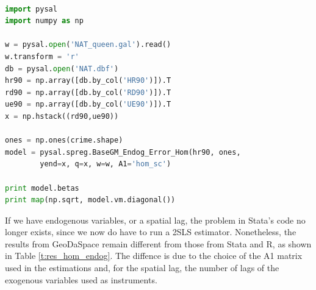 \documentclass{article}
\begin{document}
\begin{code}
\begin{lstlisting}[label=lt:hom_stata,caption=Using PySAL to match the results of spatial error models from Stata,language=Python]

import pysal
import numpy as np

w = pysal.open('NAT_queen.gal').read()
w.transform = 'r'
db = pysal.open('NAT.dbf')
hr90 = np.array([db.by_col('HR90')]).T
rd90 = np.array([db.by_col('RD90')]).T
ue90 = np.array([db.by_col('UE90')]).T
x = np.hstack((rd90,ue90))

ones = np.ones(crime.shape)
model = pysal.spreg.BaseGM_Endog_Error_Hom(hr90, ones,
        yend=x, q=x, w=w, A1='hom_sc')

print model.betas
print map(np.sqrt, model.vm.diagonal())

\end{lstlisting}
\end{code}

If we have endogenous variables, or a spatial lag, the problem in Stata's code no longer exists, since we now do have to run a 2SLS estimator. Nonetheless, the results from GeoDaSpace remain different from those from Stata and R, as shown in Table \ref{t:res_hom_endog}. The diffence is due to the choice of the A1 matrix used in the estimations and, for the spatial lag, the number of lags of the exogenous variables used as instruments.  
\end{document}
